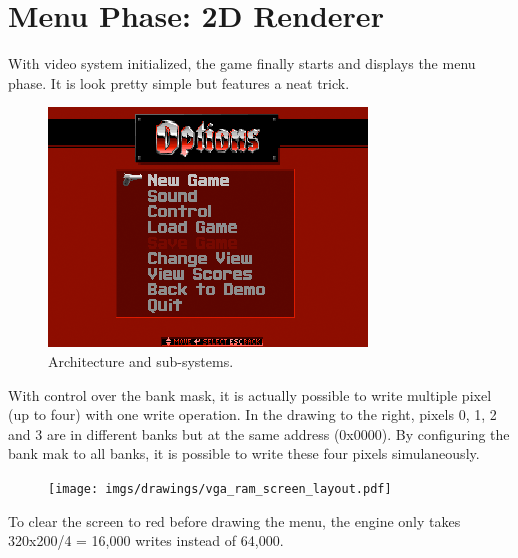 \section{Menu Phase: 2D Renderer}
With video system initialized, the game finally starts and displays the menu phase. It is look pretty simple but features a neat trick.
\par
\begin{figure}[H]
\centering
\includegraphics[width=\textwidth]{screenshots/first_menu.png}
\caption{Architecture and sub-systems.}
\end{figure}
\par

\begin{minipage}{.7\textwidth}
With control over the bank mask, it is actually possible to write multiple pixel (up to four) with one write operation. In the drawing to the right, pixels 0, 1, 2 and 3 are in different banks but at the same address (0x0000). By configuring the bank mak to all banks, it is possible to write these four pixels simulaneously.
\end{minipage}
\begin{minipage}{.3\textwidth}
\begin{figure}[H]
\centering
\texttt{[image: imgs/drawings/vga\_ram\_screen\_layout.pdf]}
\end{figure}
\end{minipage}

To clear the screen to red before drawing the menu, the engine only takes 320x200/4 = 16,000 writes instead of 64,000.\\
\par

